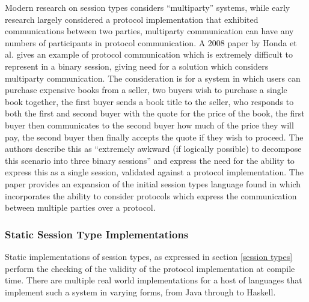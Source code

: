\documentclass{article}
\begin{document}
	Modern research on session types considers ``multiparty'' systems, while early research largely considered a protocol implementation that exhibited communications between two parties, multiparty communication can have any numbers of participants in protocol communication. A 2008 paper by Honda et al.\cite{honda2008multiparty} gives an example of protocol communication which is extremely difficult to represent in a binary session, giving need for a solution which considers multiparty  communication. The consideration is for a system in which users can purchase expensive books from a seller, two buyers wish to purchase a single book together, the first buyer sends a book title to the seller, who responds to both the first and second buyer with the quote for the price of the book, the first buyer then communicates to the second buyer how much of the price they will pay, the second buyer then finally accepts the quote if they wish to proceed. The authors describe this as ``extremely awkward (if logically possible) to decompose this scenario into three binary sessions'' and express the need for the ability to express this as a single session, validated against a protocol implementation. The paper provides an expansion of the initial session types language found in\cite{takeuchi1994interaction, honda1998language} which incorporates the ability to consider protocols which express the communication between multiple parties over a protocol.
	\subsubsection{Static Session Type Implementations}
	Static implementations of session types, as expressed in section \ref{session types} perform the checking of the validity of the protocol implementation at compile time. There are multiple real world implementations for a host of languages that implement such a system in varying forms, from Java through to Haskell\cite{lindley2016embedding}. 
	
\end{document}
